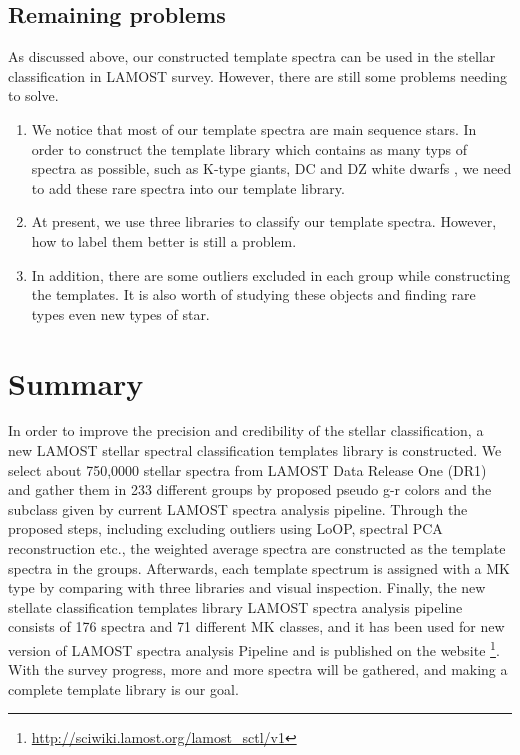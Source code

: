 \documentclass[manuscript]{aastex}
\begin{document}
\subsection{Remaining problems}
As discussed above, our constructed template spectra can be used in the stellar classification in LAMOST survey.
However, there are still some problems needing to solve.
\begin{enumerate}
\item
We notice that most of our template spectra are main sequence stars.
In order to construct the template library which contains as many typs of spectra as possible,
such as  K-type giants, DC and DZ white dwarfs \citep{si2013search},
we need to add these rare spectra into our template library.
\item
At present, we use  three libraries to classify our template spectra.
However, how to label them better is still a  problem.

\item
In addition, there are some outliers excluded in each group while constructing the templates.
It is also worth of studying these objects and finding rare types even new types of star.
\end{enumerate}



\section{Summary}
\label{sect:Summary}
In order to improve the precision  and credibility  of the stellar classification,
a new LAMOST stellar spectral classification templates library is constructed.
We select about 750,0000 stellar spectra from LAMOST Data Release One  (DR1) and gather them  in 233 different groups by proposed pseudo g-r colors and the subclass given by current LAMOST spectra analysis pipeline.
Through the proposed steps, including excluding outliers using LoOP, spectral PCA reconstruction etc.,
the weighted average spectra are constructed as the template spectra in the groups.
Afterwards, each template spectrum  is assigned with a MK type by comparing with three libraries and visual inspection.
Finally, the new stellate classification templates library LAMOST spectra analysis pipeline consists of 176 spectra and 71 different MK classes,
and it has been used for new version of LAMOST spectra analysis Pipeline and is published on the website \footnote{\url{http://sciwiki.lamost.org/lamost_sctl/v1}}.
With the survey progress,
more and more spectra will be gathered,
and making a complete template library is our goal.
\end{document}
